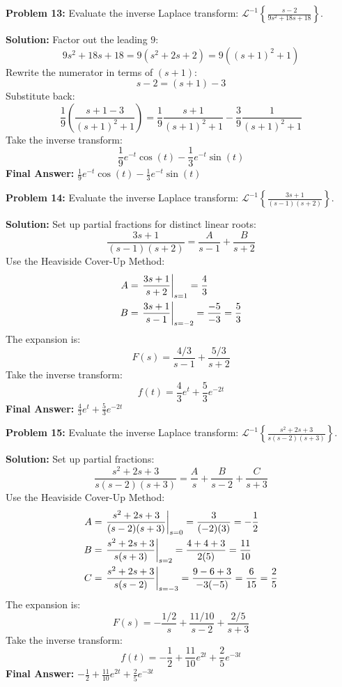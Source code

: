 \documentclass[11pt, letterpaper]{article}
\theoremstyle{definition}
\theoremstyle{remark}
\begin{document}
\vspace{1em}

\textbf{Problem 13:} Evaluate the inverse Laplace transform: $\displaystyle \mathcal{L}^{-1} \left\{ \frac{s - 2}{9s^2 + 18s + 18} \right\}$.

\textbf{Solution:}
Factor out the leading $9$:
\[
9s^2 + 18s + 18 = 9(s^2 + 2s + 2) = 9((s+1)^2 + 1)
\]
Rewrite the numerator in terms of $(s+1)$:
\[
s - 2 = (s+1) - 3
\]
Substitute back:
\[
\frac{1}{9} \left( \frac{s+1 - 3}{(s+1)^2 + 1} \right) = \frac{1}{9} \frac{s+1}{(s+1)^2 + 1} - \frac{3}{9} \frac{1}{(s+1)^2 + 1}
\]
Take the inverse transform:
\[
\frac{1}{9} e^{-t} \cos(t) - \frac{1}{3} e^{-t} \sin(t)
\]
\textbf{Final Answer:} $\displaystyle \frac{1}{9} e^{-t} \cos(t) - \frac{1}{3} e^{-t} \sin(t)$

\vspace{1em}

\textbf{Problem 14:} Evaluate the inverse Laplace transform: $\displaystyle \mathcal{L}^{-1} \left\{ \frac{3s + 1}{(s-1)(s+2)} \right\}$.

\textbf{Solution:}
Set up partial fractions for distinct linear roots:
\[
\frac{3s + 1}{(s-1)(s+2)} = \frac{A}{s-1} + \frac{B}{s+2}
\]
Use the Heaviside Cover-Up Method:
\begin{align*}
A &= \left. \frac{3s + 1}{s+2} \right|_{s=1} = \frac{4}{3} \\ \relax
B &= \left. \frac{3s + 1}{s-1} \right|_{s=-2} = \frac{-5}{-3} = \frac{5}{3}
\end{align*}
The expansion is:
\[
F(s) = \frac{4/3}{s-1} + \frac{5/3}{s+2}
\]
Take the inverse transform:
\[
f(t) = \frac{4}{3}e^t + \frac{5}{3}e^{-2t}
\]
\textbf{Final Answer:} $\displaystyle \frac{4}{3}e^t + \frac{5}{3}e^{-2t}$

\vspace{1em}

\textbf{Problem 15:} Evaluate the inverse Laplace transform: $\displaystyle \mathcal{L}^{-1} \left\{ \frac{s^2 + 2s + 3}{s(s-2)(s+3)} \right\}$.

\textbf{Solution:}
Set up partial fractions:
\[
\frac{s^2 + 2s + 3}{s(s-2)(s+3)} = \frac{A}{s} + \frac{B}{s-2} + \frac{C}{s+3}
\]
Use the Heaviside Cover-Up Method:
\begin{align*}
A &= \left. \frac{s^2 + 2s + 3}{(s-2)(s+3)} \right|_{s=0} = \frac{3}{(-2)(3)} = -\frac{1}{2} \\ \relax
B &= \left. \frac{s^2 + 2s + 3}{s(s+3)} \right|_{s=2} = \frac{4 + 4 + 3}{2(5)} = \frac{11}{10} \\ \relax
C &= \left. \frac{s^2 + 2s + 3}{s(s-2)} \right|_{s=-3} = \frac{9 - 6 + 3}{-3(-5)} = \frac{6}{15} = \frac{2}{5}
\end{align*}
The expansion is:
\[
F(s) = -\frac{1/2}{s} + \frac{11/10}{s-2} + \frac{2/5}{s+3}
\]
Take the inverse transform:
\[
f(t) = -\frac{1}{2} + \frac{11}{10}e^{2t} + \frac{2}{5}e^{-3t}
\]
\textbf{Final Answer:} $\displaystyle -\frac{1}{2} + \frac{11}{10}e^{2t} + \frac{2}{5}e^{-3t}$
\end{document}
